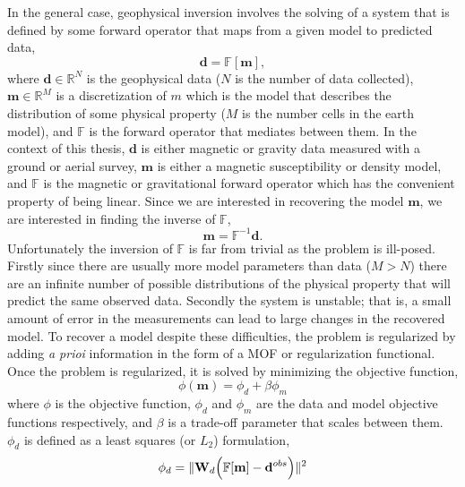 In the general case, geophysical inversion involves the solving of a system that is defined by some forward operator that maps from a given model to predicted data,
\begin{equation}
\mathbf d = \mathbb F [\mathbf m],
\end{equation}
\label{eq:forwardProb}
where $\mathbf d \in \mathbb R^N$ is the geophysical data ($N$ is the number of data collected),  $\mathbf m \in \mathbb R^M$ is a discretization of $m$ which is the model that describes the distribution of some physical property ($M$ is the number cells in the earth model), and $\mathbb F$ is the forward operator that mediates between them. In the context of this thesis, $\mathbf d$ is either magnetic or gravity data measured with a ground or aerial survey, $\mathbf m$ is either a magnetic susceptibility or density model, and $\mathbb F$ is the magnetic or gravitational forward operator which has the convenient property of being linear. Since we are interested in recovering the model $\mathbf m$, we are interested in finding the inverse of $\mathbb F$,
\begin{equation}
\mathbf m= \mathbb F^{-1}\mathbf d.
\end{equation}
\label{eq:inverseProb}
Unfortunately the inversion of $\mathbb F$ is far from trivial as the problem is ill-posed. Firstly since there are usually more model parameters than data ($M > N$) there are an infinite number of possible distributions of the physical property that will predict the same observed data. Secondly the system is unstable; that is, a small amount of error in the measurements can lead to large changes in the recovered model. To recover a model despite these difficulties, the problem is regularized by adding \emph{a prioi} information in the form of a \ac{MOF} or regularization functional. Once the problem is regularized, it is solved by minimizing the objective function,
\begin{equation}
\phi(\mathbf m) = \phi_d + \beta \phi_m
\end{equation}
\label{eq:objectiveFunc}
where $\phi$ is the objective function, $\phi_d$ and $\phi_m$ are the data and model objective functions respectively, and $\beta$ is a trade-off parameter that scales between them. $\phi_d$ is defined as a least squares (or $L_2$) formulation,
\begin{equation}
\phi_d =\|\mathbf W_d\Big(\mathbb F [\mathbf m] - \mathbf d^{obs}\Big)\|^2\\
\end{equation}
\label{eq:phid}
